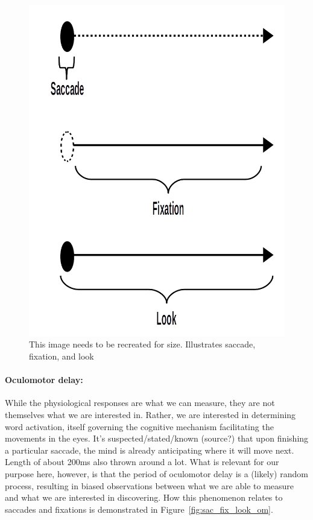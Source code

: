 \documentclass{article}
\begin{document}
\begin{figure}
\centering
\includegraphics[scale=0.25]{sac_fix_look.png}
\caption{This image needs to be recreated for size. Illustrates saccade, fixation, and look}
\label{fig:sac_fix_look}
\end{figure}

\paragraph{Oculomotor delay:} While the physiological responses are what we can measure, they are not themselves what we are interested in. Rather, we are interested in determining word activation, itself governing the cognitive mechanism facilitating the movements in the eyes. It's suspected/stated/known (source?) that upon finishing a particular saccade, the mind is already anticipating where it will move next. Length of about 200ms also thrown around a lot. What is relevant for our purpose here, however, is that the period of oculomotor delay is a (likely) random process, resulting in biased observations between what we are able to measure and what we are interested in discovering. How this phenomenon relates to saccades and fixations is demonstrated in Figure~\ref{fig:sac_fix_look_om}.
\end{document}
